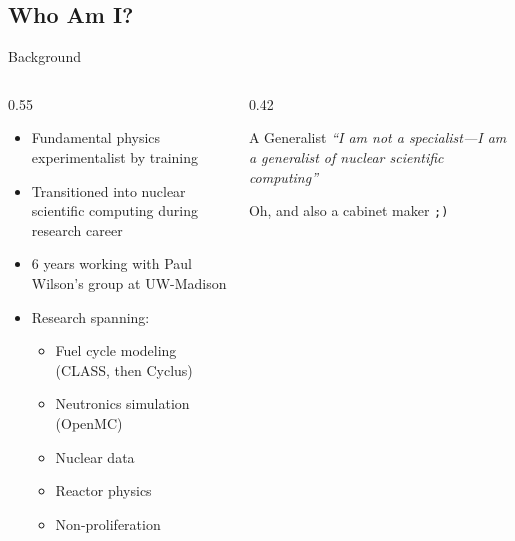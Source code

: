 \subsection{Who Am I?}
\begin{frame}{Background}
  \begin{columns}
    \begin{column}{0.55\textwidth}
      \begin{itemize}
        \item Fundamental physics experimentalist by training
        \item Transitioned into nuclear scientific computing during research career
        \item 6 years working with Paul Wilson's group at UW-Madison
        \item Research spanning:
          \begin{itemize}
            \item Fuel cycle modeling (CLASS, then Cyclus)
            \item Neutronics simulation (OpenMC)
            \item Nuclear data
            \item Reactor physics
            \item Non-proliferation
          \end{itemize}
      \end{itemize}
    \end{column}
    \begin{column}{0.42\textwidth}
      \begin{block}{A Generalist}
        \centering
        \textit{``I am not a specialist---I am a generalist of nuclear scientific computing''}
      \end{block}
      \vspace{1em}
      \centering
      \small Oh, and also a cabinet maker \texttt{;)}
    \end{column}
  \end{columns}
\end{frame}